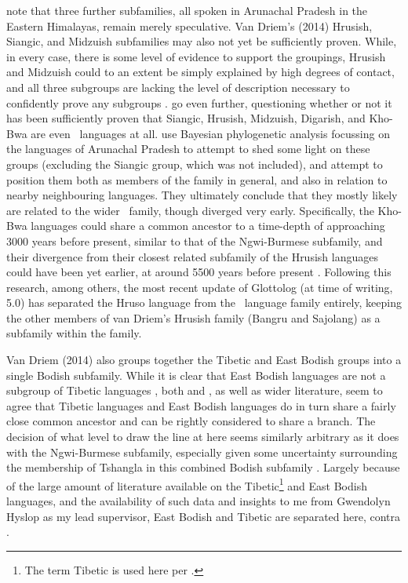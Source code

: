 note that three further subfamilies, all spoken in Arunachal Pradesh in the Eastern Himalayas, remain merely speculative. Van Driem's (2014) Hrusish, Siangic, and Midzuish subfamilies may also not yet be sufficiently proven. While, in every case, there is some level of evidence to support the groupings, Hrusish and Midzuish could to an extent be simply explained by high degrees of contact, and all three subgroups are lacking the level of description necessary to confidently prove any subgroups \cite{Post2017}.  go even further, questioning whether or not it has been sufficiently proven that Siangic, Hrusish, Midzuish, Digarish, and Kho-Bwa are even \lfam\ languages at all.  use Bayesian phylogenetic analysis focussing on the languages of Arunachal Pradesh to attempt to shed some light on these groups (excluding the Siangic group, which was not included), and attempt to position them both as members of the family in general, and also in relation to nearby neighbouring languages. They ultimately conclude that they mostly likely are related to the wider \lfam\ family, though diverged very early. Specifically, the Kho-Bwa languages could share a common ancestor to a time-depth of approaching 3000 years before present, similar to that of the Ngwi-Burmese subfamily, and their divergence from their closest related subfamily of the Hrusish languages could have been yet earlier, at around 5500 years before present \cite{Wu2022}. Following this research, among others, the most recent update of Glottolog (at time of writing, 5.0) \cite{glottolog} has separated the Hruso language from the \lfam\ language family entirely, keeping the other members of van Driem's Hrusish family (Bangru and Sajolang) as a subfamily within the family.

Van Driem (2014) also groups together the Tibetic and East Bodish groups into a single Bodish subfamily. While it is clear that East Bodish languages are not a subgroup of Tibetic languages \cite{Hyslop2017}, both  and , as well as wider literature, seem to agree that Tibetic languages and East Bodish languages do in turn share a fairly close common ancestor and can be rightly considered to share a branch. The decision of what level to draw the line at here seems similarly arbitrary as it does with the Ngwi-Burmese subfamily, especially given some uncertainty surrounding the membership of Tshangla in this combined Bodish subfamily \cite{Thurgood2017STIntro}. Largely because of the large amount of literature available on the Tibetic\footnote{The term Tibetic is used here per .} and East Bodish languages, and the availability of such data and insights to me from Gwendolyn Hyslop as my lead supervisor, East Bodish and Tibetic are separated here, contra . 

